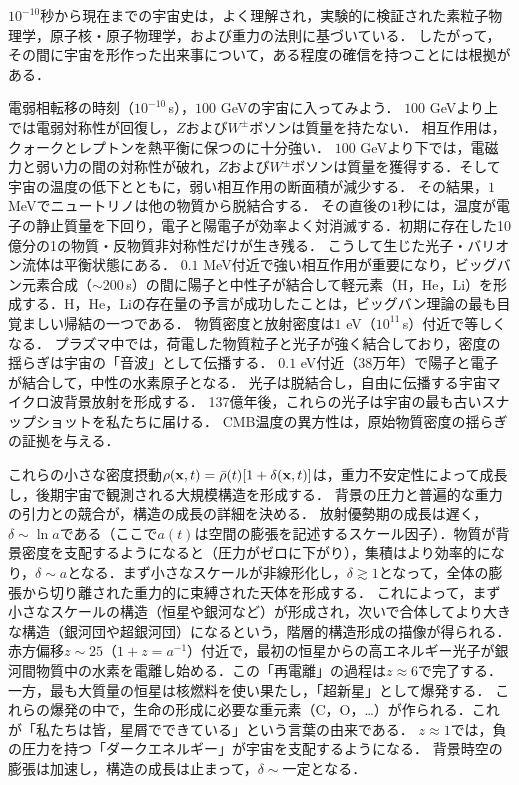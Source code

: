 $10^{-10}$秒から現在までの宇宙史は，よく理解され，実験的に検証された素粒子物理学，原子核・原子物理学，および重力の法則に基づいている．
したがって，その間に宇宙を形作った出来事について，ある程度の確信を持つことには根拠がある．

電弱相転移の時刻（$10^{-10}$\,s），$100$ GeVの宇宙に入ってみよう．
$100$ GeVより上では電弱対称性が回復し，$Z$および$W^\pm$ボソンは質量を持たない．
相互作用は，クォークとレプトンを熱平衡に保つのに十分強い．
$100$ GeVより下では，電磁力と弱い力の間の対称性が破れ，$Z$および$W^\pm$ボソンは質量を獲得する．そして宇宙の温度の低下とともに，弱い相互作用の断面積が減少する．
その結果，$1$ MeVでニュートリノは他の物質から脱結合する．
その直後の$1$秒には，温度が電子の静止質量を下回り，電子と陽電子が効率よく対消滅する．初期に存在した10億分の1の物質・反物質非対称性だけが生き残る．
こうして生じた光子・バリオン流体は平衡状態にある．
$0.1$ MeV付近で強い相互作用が重要になり，ビッグバン元素合成（$\sim 200$\,s）の間に陽子と中性子が結合して軽元素（H，He，Li）を形成する．H，He，Liの存在量の予言が成功したことは，ビッグバン理論の最も目覚ましい帰結の一つである．
物質密度と放射密度は$1$ eV（$10^{11}$\,s）付近で等しくなる．
プラズマ中では，荷電した物質粒子と光子が強く結合しており，密度の揺らぎは宇宙の「音波」として伝播する．
$0.1$ eV付近（38万年）で陽子と電子が結合して，中性の水素原子となる．
光子は脱結合し，自由に伝播する宇宙マイクロ波背景放射を形成する．
137億年後，これらの光子は宇宙の最も古いスナップショットを私たちに届ける．
CMB温度の異方性は，原始物質密度の揺らぎの証拠を与える．

これらの小さな密度摂動$\rho({\bf x}, t) = \bar \rho(t) [1+ \delta({\bf x}, t)]$は，重力不安定性によって成長し，後期宇宙で観測される大規模構造を形成する．
背景の圧力と普遍的な重力の引力との競合が，構造の成長の詳細を決める．
放射優勢期の成長は遅く，$\delta \sim \ln a$である（ここで$a(t)$は空間の膨張を記述するスケール因子）．物質が背景密度を支配するようになると（圧力がゼロに下がり），集積はより効率的になり，$\delta \sim a$となる．まず小さなスケールが非線形化し，$\delta \gtrsim 1$となって，全体の膨張から切り離された重力的に束縛された天体を形成する．
これによって，まず小さなスケールの構造（恒星や銀河など）が形成され，次いで合体してより大きな構造（銀河団や超銀河団）になるという，階層的構造形成の描像が得られる．
赤方偏移$z \sim 25$（$1+z = a^{-1}$）付近で，最初の恒星からの高エネルギー光子が銀河間物質中の水素を電離し始める．この「再電離」の過程は$z \approx 6$で完了する．
一方，最も大質量の恒星は核燃料を使い果たし，「超新星」として爆発する．
これらの爆発の中で，生命の形成に必要な重元素（C，O，\dots）が作られる．これが「私たちは皆，星屑でできている」という言葉の由来である．
$z \approx 1$では，負の圧力を持つ「ダークエネルギー」が宇宙を支配するようになる．
背景時空の膨張は加速し，構造の成長は止まって，$\delta \sim$一定となる．


